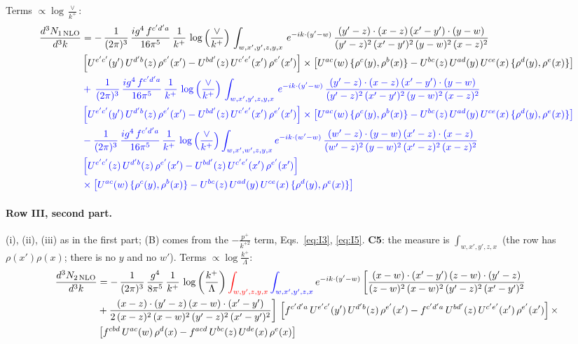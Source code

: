 \documentclass[10pt]{article}
\numberwithin{equation}{section}
\newcommand{\new}[1]{{\color{blue}#1}}
\newcommand{\old}[1]{{\color{red}#1}}
\newcommand{\nc}{\color{blue}}
\begin{document}
\noindent Terms $\propto\log\frac{\vee}{k^+}$:
\begin{align}
     \frac{d^{3}N_{1\,\rm NLO}}{d^{3}k} & =   -\,\frac{1}{(2\pi)^{3}}\, \frac{ig^{4}\,f^{c'd'a}}{16\pi^{5}}\, \frac{1}{k^{+}}\,\log{\left(\frac{\vee}{k^{+}}\right)}\, \int_{w,x',y',z,y,x}\, e^{-ik\cdot (y'-w)}\,\frac{(y'-z)\cdot (x-z)\,(x'-y')\cdot (y-w)}{(y'-z)^{2}\,(x'-y')^{2}\,(y-w)^{2}\,(x-z)^{2}}\notag \\ &  \left[U^{e'c'}(y')\,U^{d'b}(z)\,\rho^{e'}(x')-U^{bd'}(z)\,U^{c'e'}(x')\,\rho^{e'}(x')\right]\times  \left[U^{ac}(w)\, \{\rho^{c}(y),\rho^{b}(x)\}-U^{bc}(z)\,U^{ad}(y)\,U^{ce}(x)\,\{\rho^{d}(y),\rho^{e}(x)\}\right] \notag \\
& \nc  +\,\frac{1}{(2\pi)^{3}}\, \frac{ig^{4}\,f^{c'd'a}}{16\pi^{5}}\, \frac{1}{k^{+}}\,\log{\left(\frac{\vee}{k^{+}}\right)}\, \int_{w,x',y',z,y,x}\, e^{-ik\cdot (y'-w)}\,\frac{(y'-z)\cdot (x-z)\,(x'-y')\cdot (y-w)}{(y'-z)^{2}\,(x'-y')^{2}\,(y-w)^{2}\,(x-z)^{2}}\notag \\ & \nc   \left[U^{e'c'}(y')\,U^{d'b}(z)\,\rho^{e'}(x')-U^{bd'}(z)\,U^{c'e'}(x')\,\rho^{e'}(x')\right]\times  \left[U^{ac}(w)\, \{\rho^{c}(y),\rho^{b}(x)\}-U^{bc}(z)\,U^{ad}(y)\,U^{ce}(x)\,\{\rho^{d}(y),\rho^{e}(x)\}\right] \notag \\
& \nc  -\frac{1}{(2\pi)^{3}}\, \frac{ig^{4}\,f^{c'd'a}}{16\pi^{5}}\, \frac{1}{k^{+}}\,\log{\left(\frac{\vee}{k^{+}}\right)}\int_{w,x',w',z,y,x} e^{-ik\cdot (w'-w)}\,\frac{(w'-z)\cdot (y-w)\,(x'-z)\cdot (x-z)}{(w'-z)^{2}\,(y-w)^{2}\,(x'-z)^{2}\,(x-z)^{2}}\notag \\
& \nc  \left[U^{e'c'}(z)\,U^{d'b}(z)\,\rho^{e'}(x')-U^{bd'}(z)\,U^{c'e'}(x')\,\rho^{e'}(x')\right]\notag \\
& \nc  \times\left[U^{ac}(w)\, \{\rho^{c}(y),\rho^{b}(x)\}-U^{bc}(z)\,U^{ad}(y)\,U^{ce}(x)\,\{\rho^{d}(y),\rho^{e}(x)\}\right] \label{eq:B:G3III1}
\end{align}

\paragraph{Row III, second part.}
(i), (ii), (iii) as in the first part; (B) comes from the $-\frac{p^+}{k^{+2}}$ term, Eqs.~\eqref{eq:I3}, \eqref{eq:I5}. \textbf{C5}: the measure is $\int_{w,x',y',z,x}$ (the row has $\rho(x')\rho(x)$; there is no $y$ and no $w'$).
\noindent Terms $\propto\log\frac{k^+}{\Lambda}$:
\begin{align}
 \frac{d^{3}N_{2\,\rm NLO}}{d^{3}k} & =    -\, \frac{1}{(2\pi)^{3}}\,\frac{g^{4}}{8\pi^{5}}\,\frac{1}{k^{+}}\,\log{\left(\frac{k^{+}}{\Lambda}\right)}\,\old{\int_{w,y',z,y,x}}\,\new{\int_{w,x',y',z,x}}\, e^{-ik\cdot (y'-w)}\,\bigg[\frac{(x-w)\cdot (x'-y')\,(z-w)\cdot (y'-z)}{(z-w)^{2}\,(x-w)^{2}\,(y'-z)^{2}\,(x'-y')^{2}}\notag \\ & +\frac{(x-z)\cdot (y'-z)\,(x-w)\cdot (x'-y')}{2\,(x-z)^{2}\,(x-w)^{2}\,(y'-z)^{2}\,(x'-y')^{2}}\bigg]\, \left[f^{c'd'a}\,U^{e'c'}(y')\,U^{d'b}(z)\,\rho^{e'}(x')-f^{c'd'a}\, 
    U^{bd'}(z)\,U^{c'e'}(x')\,\rho^{e'}(x')\right]\times\notag \\ &  \left[f^{cbd}\,U^{ac}(w)\,\rho^{d}(x) -f^{acd}\,U^{bc}(z)\,U^{de}(x)\,\rho^{e}(x)\right] \label{eq:J:G3III2}
\end{align}
\end{document}
